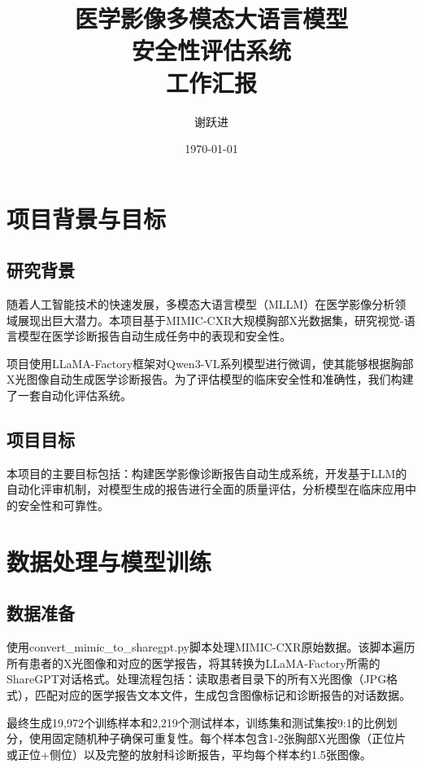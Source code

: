 \documentclass[12pt,a4paper]{article}
\title{\textbf{医学影像多模态大语言模型\\安全性评估系统\\工作汇报}}
\author{谢跃进}
\date{\today}
\begin{document}
\maketitle

\tableofcontents
\newpage

\section{项目背景与目标}

\subsection{研究背景}

随着人工智能技术的快速发展，多模态大语言模型（MLLM）在医学影像分析领域展现出巨大潜力。本项目基于MIMIC-CXR大规模胸部X光数据集，研究视觉-语言模型在医学诊断报告自动生成任务中的表现和安全性。

项目使用LLaMA-Factory框架对Qwen3-VL系列模型进行微调，使其能够根据胸部X光图像自动生成医学诊断报告。为了评估模型的临床安全性和准确性，我们构建了一套自动化评估系统。

\subsection{项目目标}

本项目的主要目标包括：构建医学影像诊断报告自动生成系统，开发基于LLM的自动化评审机制，对模型生成的报告进行全面的质量评估，分析模型在临床应用中的安全性和可靠性。

\section{数据处理与模型训练}

\subsection{数据准备}

使用convert\_mimic\_to\_sharegpt.py脚本处理MIMIC-CXR原始数据。该脚本遍历所有患者的X光图像和对应的医学报告，将其转换为LLaMA-Factory所需的ShareGPT对话格式。处理流程包括：读取患者目录下的所有X光图像（JPG格式），匹配对应的医学报告文本文件，生成包含图像标记和诊断报告的对话数据。

最终生成19,972个训练样本和2,219个测试样本，训练集和测试集按9:1的比例划分，使用固定随机种子确保可重复性。每个样本包含1-2张胸部X光图像（正位片或正位+侧位）以及完整的放射科诊断报告，平均每个样本约1.5张图像。
\end{document}
